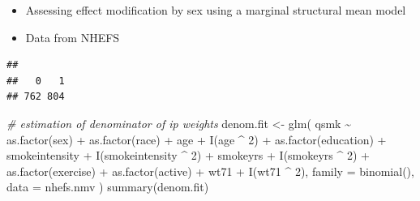 \documentclass[
  10pt,
]{book}
\newenvironment{Shaded}{\begin{snugshade}}{\end{snugshade}}
\newcommand{\AttributeTok}[1]{\textcolor[rgb]{0.77,0.63,0.00}{#1}}
\newcommand{\CommentTok}[1]{\textcolor[rgb]{0.56,0.35,0.01}{\textit{#1}}}
\newcommand{\DecValTok}[1]{\textcolor[rgb]{0.00,0.00,0.81}{#1}}
\newcommand{\FunctionTok}[1]{\textcolor[rgb]{0.00,0.00,0.00}{#1}}
\newcommand{\NormalTok}[1]{#1}
\newcommand{\OtherTok}[1]{\textcolor[rgb]{0.56,0.35,0.01}{#1}}
\newcommand{\SpecialCharTok}[1]{\textcolor[rgb]{0.00,0.00,0.00}{#1}}
\providecommand{\tightlist}{%
  \setlength{\itemsep}{0pt}\setlength{\parskip}{0pt}}
\begin{document}
\begin{itemize}
\tightlist
\item
  Assessing effect modification by sex using a marginal structural mean model
\item
  Data from NHEFS
\end{itemize}

\begin{Shaded}
\end{Shaded}

\begin{verbatim}
## 
##   0   1 
## 762 804
\end{verbatim}

\begin{Shaded}
\begin{Highlighting}[]
\CommentTok{\# estimation of denominator of ip weights}
\NormalTok{denom.fit }\OtherTok{\textless{}{-}}
  \FunctionTok{glm}\NormalTok{(}
\NormalTok{    qsmk }\SpecialCharTok{\textasciitilde{}} \FunctionTok{as.factor}\NormalTok{(sex) }\SpecialCharTok{+} \FunctionTok{as.factor}\NormalTok{(race) }\SpecialCharTok{+}\NormalTok{ age }\SpecialCharTok{+} \FunctionTok{I}\NormalTok{(age }\SpecialCharTok{\^{}} \DecValTok{2}\NormalTok{) }\SpecialCharTok{+}
      \FunctionTok{as.factor}\NormalTok{(education) }\SpecialCharTok{+}\NormalTok{ smokeintensity }\SpecialCharTok{+}
      \FunctionTok{I}\NormalTok{(smokeintensity }\SpecialCharTok{\^{}} \DecValTok{2}\NormalTok{) }\SpecialCharTok{+}\NormalTok{ smokeyrs }\SpecialCharTok{+} \FunctionTok{I}\NormalTok{(smokeyrs }\SpecialCharTok{\^{}} \DecValTok{2}\NormalTok{) }\SpecialCharTok{+}
      \FunctionTok{as.factor}\NormalTok{(exercise) }\SpecialCharTok{+} \FunctionTok{as.factor}\NormalTok{(active) }\SpecialCharTok{+}\NormalTok{ wt71 }\SpecialCharTok{+} \FunctionTok{I}\NormalTok{(wt71 }\SpecialCharTok{\^{}} \DecValTok{2}\NormalTok{),}
    \AttributeTok{family =} \FunctionTok{binomial}\NormalTok{(),}
    \AttributeTok{data =}\NormalTok{ nhefs.nmv}
\NormalTok{  )}
\FunctionTok{summary}\NormalTok{(denom.fit)}
\end{Highlighting}
\end{Shaded}
\end{document}
